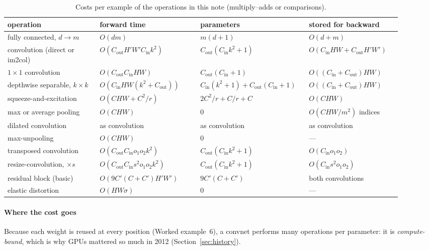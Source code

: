 \documentclass[11pt]{article}
\newcommand{\Cin}{C_{\mathrm{in}}}
\newcommand{\Cout}{C_{\mathrm{out}}}
\newcommand{\Hout}{H'}
\newcommand{\Wout}{W'}
\begin{document}
\begin{table}[htbp]
\centering\small
\caption{Costs per example of the operations in this note (multiply--adds or comparisons).}
\label{tab:cost}
\begin{tabular}{@{}L{0.22\linewidth}L{0.24\linewidth}L{0.23\linewidth}L{0.22\linewidth}@{}}
\toprule
operation & forward time & parameters & stored for backward \\
\midrule
fully connected, $d \to m$ & $O(dm)$ & $m(d + 1)$ & $O(d + m)$ \\
convolution (direct or im2col) & $O(\Cout\Hout\Wout\Cin k^2)$ & $\Cout(\Cin k^2 + 1)$ & $O(\Cin HW + \Cout\Hout\Wout)$ \\
$1 \times 1$ convolution & $O(\Cout\Cin HW)$ & $\Cout(\Cin + 1)$ & $O((\Cin + \Cout)HW)$ \\
depthwise separable, $k \times k$ & $O(\Cin HW(k^2 + \Cout))$ & $\Cin(k^2 + 1) + \Cout(\Cin + 1)$ & $O((\Cin + \Cout)HW)$ \\
squeeze-and-excitation & $O(CHW + C^2/r)$ & $2C^2/r + C/r + C$ & $O(CHW)$ \\
max or average pooling & $O(CHW)$ & $0$ & $O(CHW/m^2)$ indices \\
dilated convolution & as convolution & as convolution & as convolution \\
max-unpooling & $O(CHW)$ & $0$ & --- \\
transposed convolution & $O(\Cout\Cin o_1o_2k^2)$ & $\Cout(\Cin k^2 + 1)$ & $O(\Cin o_1o_2)$ \\
resize-convolution, $\times s$ & $O(\Cout\Cin s^2o_1o_2k^2)$ & $\Cout(\Cin k^2 + 1)$ & $O(\Cin s^2o_1o_2)$ \\
residual block (basic) & $O(9C'(C + C')\Hout\Wout)$ & $9C'(C + C')$ & both convolutions \\
elastic distortion & $O(HW\sigma)$ & $0$ & --- \\
\bottomrule
\end{tabular}
\end{table}

\paragraph{Where the cost goes} Because each weight is reused at every position (Worked example~6), a convnet performs
many operations per parameter: it is \emph{compute-bound}, which is why GPUs mattered so much in 2012
(Section~\ref{sec:history}).
\end{document}
